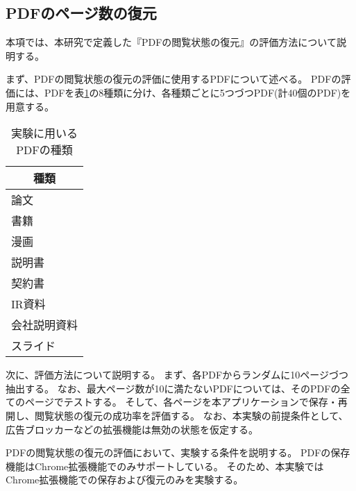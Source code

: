 \subsection{PDFのページ数の復元}
本項では、本研究で定義した『PDFの閲覧状態の復元』の評価方法について説明する。

まず、PDFの閲覧状態の復元の評価に使用するPDFについて述べる。
PDFの評価には、PDFを表\ref{tb:evl-pdf-list}の8種類に分け、各種類ごとに5つづつPDF(計40個のPDF)を用意する。

\begin{table}[htbp]
  \label{tb:evl-pdf-list}
  \caption{実験に用いるPDFの種類}
  \begin{center}
    \begin{tabular}{|l|}
    \hline
    \multicolumn{1}{|c|}{\textbf{種類}} \\\hline
    論文 \\ \hline
    書籍 \\ \hline
    漫画 \\ \hline
    説明書 \\ \hline
    契約書 \\ \hline
    IR資料 \\ \hline
    会社説明資料 \\ \hline
    スライド \\ \hline
    \end{tabular}
  \end{center}
\end{table}

次に、評価方法について説明する。
まず、各PDFからランダムに10ページづつ抽出する。
なお、最大ページ数が10に満たないPDFについては、そのPDFの全てのページでテストする。
そして、各ページを本アプリケーションで保存・再開し、閲覧状態の復元の成功率を評価する。
なお、本実験の前提条件として、広告ブロッカーなどの拡張機能は無効の状態を仮定する。

PDFの閲覧状態の復元の評価において、実験する条件を説明する。
PDFの保存機能はChrome拡張機能でのみサポートしている。
そのため、本実験ではChrome拡張機能での保存および復元のみを実験する。
